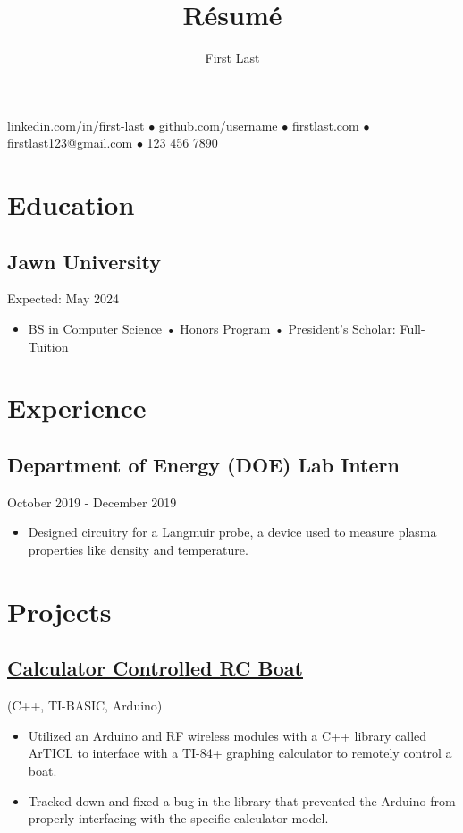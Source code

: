 \documentclass{article}
\makeatletter
\renewcommand{\maketitle}{
    \begin{center}
        {\huge\bfseries
        \theauthor}
    \end{center}
    \begin{center}
        \vspace{1em}
        \leavevmode
        \href{https://youtu.be/DLzxrzFCyOs}{linkedin.com/in/first-last} $\bullet$ \href{https://youtu.be/DLzxrzFCyOs}{github.com/username} $\bullet$ \href{https://youtu.be/DLzxrzFCyOs}{firstlast.com} $\bullet$ \href{https://youtu.be/DLzxrzFCyOs}{firstlast123@gmail.com} $\bullet$ 123 456 7890
    \end{center}
}
\makeatother
\begin{document}
\title{R\'esum\'e}
\author{First Last}

\maketitle
\section{Education}
\subsection{Jawn University} \hfill Expected: May 2024
\begin{itemize}
    \item BS in Computer Science • Honors Program • President's Scholar: Full-Tuition
\end{itemize}

\section{Experience}
\subsection{Department of Energy (DOE) Lab Intern}\hfill October 2019 - December 2019
\begin{itemize}
    \item Designed circuitry for a Langmuir probe, a device used to measure plasma properties like density and temperature.
\end{itemize}

\section{Projects}

\subsection{\href{https://youtu.be/DLzxrzFCyOs}{\underline{Calculator Controlled RC Boat}}} \hfill (C++, TI-BASIC, Arduino)
\begin{itemize}
    \item Utilized an Arduino and RF wireless modules with a C++ library called ArTICL to interface with a TI-84+ graphing calculator to remotely control a boat.
    \item Tracked down and fixed a bug in the library that prevented the Arduino from properly interfacing with the specific calculator model.
\end{itemize}
\end{document}
